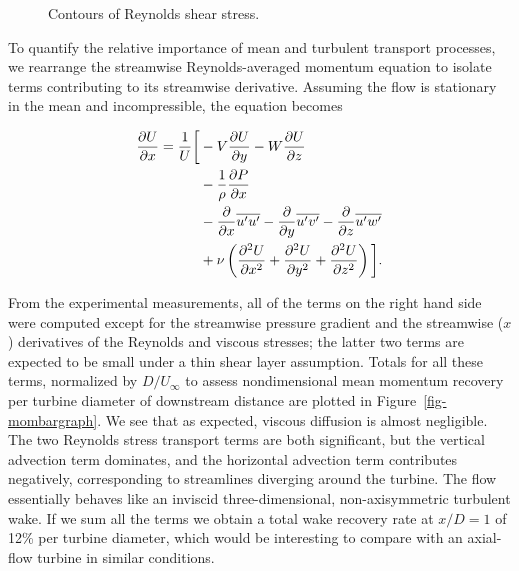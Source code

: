 \begin{figure}
    \centering
    \caption{Contours of Reynolds shear stress.}
    \label{fig-restress}
\end{figure}

To quantify the relative importance of mean and turbulent transport processes,
we rearrange the streamwise Reynolds-averaged momentum equation to isolate terms
contributing to its streamwise derivative. Assuming the flow is stationary in
the mean and incompressible, the equation becomes

\begin{equation}
    \begin{split}
        \frac{\partial U}{\partial x}  =  
        \frac{1}{U} \bigg{[}
        & - V\frac{\partial U}{\partial y}
        - W\frac{\partial U}{\partial z} \\
        & -\frac{1}{\rho}\frac{\partial P}{\partial x} \\
        & - \frac{\partial}{\partial x} \overline{u'u'}
        - \frac{\partial}{\partial y} \overline{u'v'}
        - \frac{\partial}{\partial z} \overline{u'w'} \\
        & + \nu\left(\frac{\partial^2 U}{\partial x^2}
        + \frac{\partial^2 U}{\partial y^2}
        + \frac{\partial^2 U}{\partial z^2} \right)
        \bigg{]}.
    \end{split}
\label{eq:momentum}
\end{equation}

From the experimental measurements, all of the terms on the right hand side were
computed except for the streamwise pressure gradient and the streamwise ($x$)
derivatives of the Reynolds and viscous stresses; the latter two terms are
expected to be small under a thin shear layer assumption. Totals for all these
terms, normalized by $D/U_\infty$ to assess nondimensional mean momentum
recovery per turbine diameter of downstream distance are plotted in
Figure~\ref{fig-mombargraph}. We see that as expected, viscous diffusion is
almost negligible. The two Reynolds stress transport terms are both significant,
but the vertical advection term dominates, and the horizontal advection term
contributes negatively, corresponding to streamlines diverging around the
turbine. The flow essentially behaves like an inviscid three-dimensional,
non-axisymmetric turbulent wake. If we sum all the terms we obtain a total wake
recovery rate at $x/D=1$ of 12\% per turbine diameter, which would be
interesting to compare with an axial-flow turbine in similar conditions.

